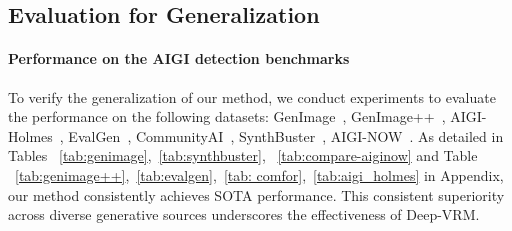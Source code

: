 \documentclass{article}
\theoremstyle{plain}
\theoremstyle{definition}
\theoremstyle{remark}
\begin{document}
\subsection{Evaluation for Generalization}
\paragraph{Performance on the AIGI detection benchmarks}
To verify the generalization of our method, we conduct experiments to evaluate the performance on the following datasets: GenImage~\citep{zhu2023genimage}, GenImage++~\cite{zhou2025breaking}, AIGI-Holmes~\cite{zhou2025aigi}, EvalGen~\cite{chen2025dual}, CommunityAI~\cite{park2025community}, SynthBuster~\cite{Synthbuster}, AIGI-NOW~\cite{chen2025task}. 
As detailed in Tables ~\ref{tab:genimage},~\ref{tab:synthbuster}, ~\ref{tab:compare-aiginow} and Table ~\ref{tab:genimage++},~\ref{tab:evalgen},~\ref{tab: comfor},~\ref{tab:aigi_holmes} in Appendix, our method consistently achieves SOTA performance. This consistent superiority across diverse generative sources underscores the effectiveness of Deep-VRM. 
\end{document}
